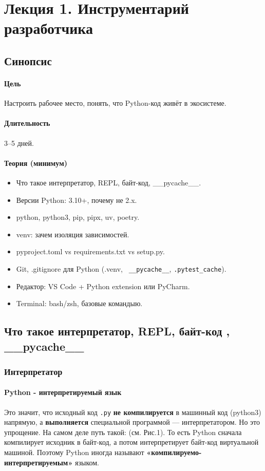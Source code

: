 \section{Лекция 1. Инструментарий разработчика}

\subsection*{Синопсис}
\paragraph*{Цель}

Настроить рабочее место, понять, что Python-код живёт в экосистеме.
\paragraph*{Длительность}

3–5 дней.
\paragraph*{Теория (минимум)}
\begin{itemize}
\item Что такое интерпретатор, REPL, байт-код, \_\_pycache\_\_.
\item Версии Python: 3.10+, почему не 2.x.
\item python, python3, pip, pipx, uv, poetry.
\item venv: зачем изоляция зависимостей.
\item pyproject.toml vs requirements.txt vs setup.py.
\item Git, .gitignore для Python (.venv, \verb| __pycache__|,  \verb|.pytest_cache|).
\item Редактор: VS Code + Python extension или PyCharm.
\item Terminal: bash/zsh, базовые командыю.
\end{itemize}

\subsection{Что такое интерпретатор, REPL, байт-код , \_\_pycache\_\_ }
\subsubsection{Интерпретатор}

\paragraph*{Python - интерпретируемый язык}
Это значит, что исходный код \texttt{.py} \textbf{не компилируется} в машинный код (python3) напрямую,  а \textbf{выполняется} специальной программой --- \linebreak интерпретатором.
Но это упрощение. На самом деле путь такой: (см. Рис.1).
То есть Python сначала компилирует исходник в байт-код, а потом интерпретирует байт-код виртуальной машиной.
Поэтому Python иногда называют \textbf{«компилируемо-интерпретируемым»} языком.

